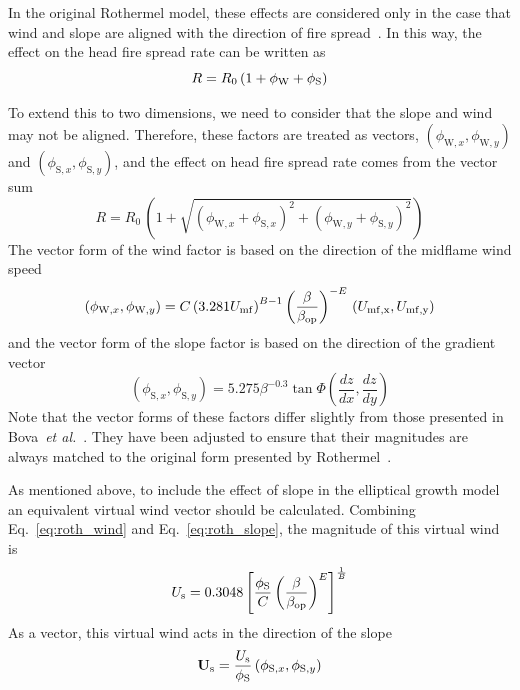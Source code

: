 In the original Rothermel model, these effects are considered only in the case that wind and slope are aligned with the direction of fire spread~\cite{Rothermel:1972}. In this way, the effect on the head fire spread rate can be written as
\begin{equation}
R = R_0 \, (1+ \phi_{\rm W} + \phi_{\rm S})
\end{equation}

To extend this to two dimensions, we need to consider that the slope and wind may not be aligned. Therefore, these factors are treated as vectors, $(\phi_{\mathrm{W},x}, \phi_{\mathrm{W},y})$ and $(\phi_{\mathrm{S},x}, \phi_{\mathrm{S},y})$, and the effect on head fire spread rate comes from the vector sum
\begin{equation}
R = R_0 \, \left(1 + \sqrt{(\phi_{\mathrm{W},x} + \phi_{\mathrm{S},x})^2 + (\phi_{\mathrm{W},y} + \phi_{\mathrm{S},y})^2}\right)
\end{equation}
The vector form of the wind factor is based on the direction of the midflame wind speed
\begin{equation}
(\phi_{\mathrm{W},x}, \phi_{\mathrm{W},y}) = 
C\left(3.281 U_{\rm mf}\right)^{B-1}\left(\frac{\beta}{\beta_{\rm op}}\right)^{-E} \, (U_{\rm mf,x},U_{\rm mf,y})
\end{equation}
and the vector form of the slope factor is based on the direction of the gradient vector
\begin{equation}
(\phi_{\mathrm{S},x}, \phi_{\mathrm{S},y}) = 
5.275 \beta^{-0.3}\tan \Phi \left(\frac{dz}{dx},\frac{dz}{dy}\right)
\end{equation}
Note that the vector forms of these factors differ slightly from those presented in Bova~\textit{et al.}~\cite{Bova:IJWF2015}. They have been adjusted to ensure that their magnitudes are always matched to the original form presented by Rothermel~\cite{Rothermel:1972}.

As mentioned above, to include the effect of slope in the elliptical growth model an equivalent virtual wind vector should be calculated. Combining Eq.~\ref{eq:roth_wind} and Eq.~\ref{eq:roth_slope}, the magnitude of this virtual wind is
\begin{equation}
U_{\rm s} = 0.3048\left[\frac{\phi_{\rm S}}{C}\left(\frac{\beta}{\beta_{\mathrm{op}}}\right)^{E} 
\right]^{\frac{1}{B}}
\end{equation}
As a vector, this virtual wind acts in the direction of the slope
\begin{equation}
\mathbf{U}_{\rm s} = \frac{U_{\rm s}}{\phi_{\rm S}} \left(\phi_{\mathrm{S},x},\phi_{\mathrm{S},y}\right)
\end{equation}

